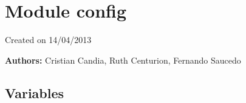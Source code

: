 %
%
%


\section{Module config}

    \label{config}
Created on 14/04/2013

\textbf{Authors:}
Cristian Candia,
    Ruth Centurion,
    Fernando Saucedo



  \subsection{Variables}

